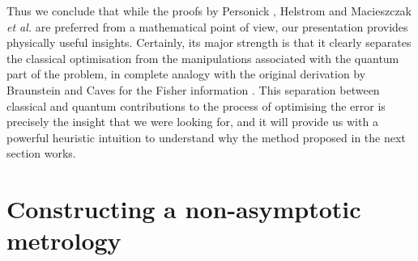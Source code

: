 Thus we conclude that while the proofs by Personick \cite{personick1971}, Helstrom \cite{helstrom1976} and Macieszczak \emph{et al.} \cite{macieszczak2014bayesian} are preferred from a mathematical point of view, our presentation provides physically useful insights. Certainly, its major strength is that it clearly separates the classical optimisation from the manipulations associated with the quantum part of the problem, in complete analogy with the original derivation by Braunstein and Caves for the Fisher information \cite{braunstein1996}. This separation between classical and quantum contributions to the process of optimising the error is precisely the insight that we were looking for, and it will provide us with a powerful heuristic intuition to understand why the method proposed in the next section works. 

\section{Constructing a non-asymptotic metrology}
\label{subsec:constructingmethod}

